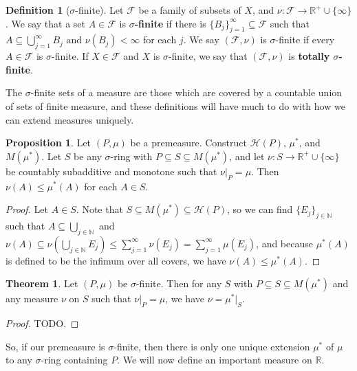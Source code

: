 \documentclass[11pt, oneside]{amsart}   	%
\theoremstyle{definition}
\newtheorem{definition}{Definition}[section]
\newtheorem{theorem}{Theorem}[section]
\newtheorem{prop}{Proposition}[section]
\begin{document}
	\begin{definition}[$\sigma$-finite]
		Let $\mathcal F$ be a family of subsets of $X$, and $\nu : \mathcal F\rightarrow\mathbb R^+\cup\{\infty\}$. We say 
		that a set $A\in\mathcal F$ is \textbf{$\sigma$-finite} if there is $\{B_j\}_{j = 1}^\infty\subseteq\mathcal F$ such that 
		$A\subseteq \bigcup_{j = 1}^\infty B_j$ and $\nu(B_j) < \infty$ for each $j$. We say $(\mathcal F, \nu)$ is 
		$\sigma$-finite if every $A\in\mathcal F$ is $\sigma$-finite. If $X\in\mathcal F$ and $X$ is $\sigma$-finite, we say 
		that $(\mathcal F, \nu)$ is \textbf{totally $\sigma$-finite}. 
	\end{definition}
	
	The $\sigma$-finite sets of a measure are those which are covered by a countable union of sets of finite measure, and 
	these definitions will have much to do with how we can extend measures uniquely. 
	
	\begin{prop}
	Let $(P, \mu)$ be a premeasure. Construct $\mathcal H(P)$, $\mu^*$, and $M(\mu^*)$. Let $S$ be any $\sigma$-ring
	 with $P\subseteq S\subseteq M(\mu^*)$, and let $\nu : S\rightarrow\mathbb R^+\cup\{\infty\}$ be countably subadditive 
	 and monotone such that $\nu|_P = \mu$. Then $\nu(A)\leq \mu^*(A)$ for each $A\in S$. 
	\end{prop}
	
	\begin{proof}
		Let $A\in S$. Note that $S\subseteq M(\mu^*)\subseteq\mathcal H(P)$, so we can find $\{E_j\}_{j\in\mathbb N}$ 
		such that $A\subseteq\bigcup_{j\in\mathbb N}$ and $\nu(A)\subseteq\nu(\bigcup_{j\in\mathbb N} E_j)\leq
		\sum_{j = 1}^\infty\nu(E_j) = \sum_{j = 1}^\infty\mu(E_j)$, and because $\mu^*(A)$ is defined to be the infimum 
		over all covers, we have $\nu(A)\leq\mu^*(A)$. 
	\end{proof}
	
	\begin{theorem}
		Let $(P, \mu)$ be $\sigma$-finite. Then for any $S$ with $P\subseteq S\subseteq M(\mu^*)$ and any measure 
		$\nu$ on $S$ such that $\nu|_P = \mu$, we have $\nu = \mu^*|_S$. 
	\end{theorem}
	
	\begin{proof}
		TODO.
	\end{proof}
	
	So, if our premeasure is $\sigma$-finite, then there is only one unique extension $\mu^*$ of $\mu$ to any $\sigma$-ring 
	containing $P$. We will now define an important measure on $\mathbb R$. 
	
\end{document}

